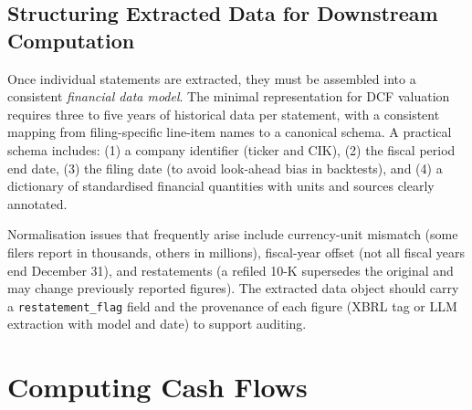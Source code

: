 \begin{context}
\subsection{Structuring Extracted Data for Downstream Computation}
\label{subsec:bv-extraction-structuring}

Once individual statements are extracted, they must be assembled into a consistent
\emph{financial data model}. The minimal representation for DCF valuation requires
three to five years of historical data per statement, with a consistent mapping from
filing-specific line-item names to a canonical schema. A practical schema includes:
(1) a company identifier (ticker and CIK), (2) the fiscal period end date, (3) the
filing date (to avoid look-ahead bias in backtests), and (4) a dictionary of
standardised financial quantities with units and sources clearly annotated.

Normalisation issues that frequently arise include currency-unit mismatch (some filers
report in thousands, others in millions), fiscal-year offset (not all fiscal years end
December 31), and restatements (a refiled 10-K supersedes the original and may change
previously reported figures). The extracted data object should carry a
\texttt{restatement\_flag} field and the provenance of each figure (XBRL tag or LLM
extraction with model and date) to support auditing.
\end{context}


\section{Computing Cash Flows}
\label{sec:bv-cashflows}

